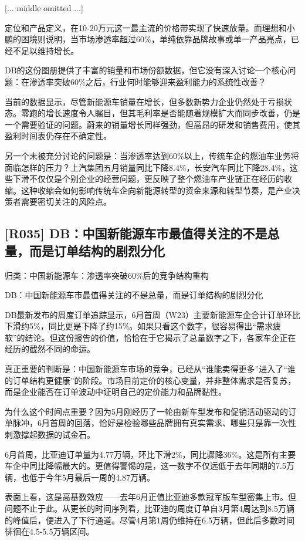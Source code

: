 \documentclass[11pt]{ctexart}
\begin{document}
[... middle omitted ...]

定位和产品定义，在10-20万元这一最主流的价格带实现了快速放量。而理想和小鹏的困境则说明，当市场渗透率超过60\%，单纯依靠品牌故事或单一产品亮点，已经不足以维持增长。

DB的这份图册提供了丰富的销量和市场份额数据，但它没有深入讨论一个核心问题：在渗透率突破60\%之后，行业何时能够迎来盈利能力的系统性改善？

当前的数据显示，尽管新能源车销量在增长，但多数新势力企业仍然处于亏损状态。零跑的增长速度令人瞩目，但其毛利率是否能随着规模扩大而同步改善，仍是一个需要验证的问题。蔚来的销量增长同样强劲，但高昂的研发和销售费用，使其盈利时间表仍存在不确定性。

另一个未被充分讨论的问题是：当渗透率达到60\%以上，传统车企的燃油车业务将面临怎样的压力？上汽集团五月销量同比下降8.4\%，长安汽车同比下降28.4\%，这些下滑不仅仅是个别企业的经营问题，更反映了整个燃油车产业链正在经历的收缩。这种收缩会如何影响传统车企向新能源转型的资金来源和转型节奏，是产业决策者需要密切关注的风险点。

\subsection{[R035] DB：中国新能源车市最值得关注的不是总量，而是订单结构的剧烈分化}
{\small\color{refgray}归类：中国新能源车：渗透率突破60\%后的竞争结构重构}

DB：中国新能源车市最值得关注的不是总量，而是订单结构的剧烈分化

DB最新发布的周度订单追踪显示，6月首周（W23）主要新能源车企合计订单环比下滑约5\%，同比更是下降了约15\%。如果只看这个数字，很容易得出“需求疲软”的结论。但这份报告的价值，恰恰在于它揭示了总量数字之下，各家车企正在经历的截然不同的命运。

真正重要的判断是：中国新能源车市场的竞争，已经从“谁能卖得更多”进入了“谁的订单结构更健康”的阶段。市场目前定价的核心变量，并非整体需求是否复苏，而是企业能否在订单波动中证明自己的定价能力和品牌黏性。

为什么这个时间点重要？因为5月刚经历了一轮由新车型发布和促销活动驱动的订单脉冲，6月首周的回落，恰好是检验哪些品牌拥有真实需求、哪些只是靠一次性刺激撑起数据的试金石。

6月首周，比亚迪订单量为4.77万辆，环比下滑2\%，同比骤降36\%。这是所有主要车企中同比降幅最大的。更值得警惕的是，这一数字不仅远低于去年同期的7.5万辆，也低于今年5月最后一周的4.87万辆。

表面上看，这是高基数效应——去年6月正值比亚迪多款冠军版车型密集上市。但问题不止于此。从更长的时间序列看，比亚迪的周度订单自3月第4周达到8.5万辆的峰值后，便进入了下行通道。尽管4月第1周仍维持在6.5万辆，但此后多数时间徘徊在4.5-5.5万辆区间。
\end{document}
